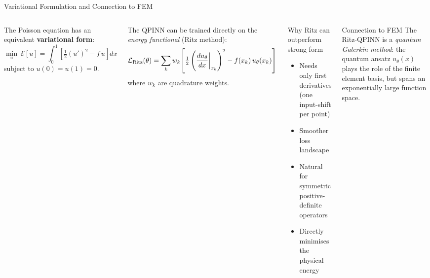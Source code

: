 \documentclass[aspectratio=169,10pt]{beamer}
\begin{document}
\begin{frame}{Variational Formulation and Connection to FEM}
  \begin{columns}[T]
      The Poisson equation has an equivalent \textbf{variational form}:
      \[
        \min_u\,\mathcal{E}[u]
        = \int_0^1\!\left[\tfrac12(u')^2 - f\,u\right]dx
      \]
      subject to $u(0)=u(1)=0$.

      The QPINN can be trained directly on the
      \emph{energy functional} (Ritz method):
      \[
        \mathcal{L}_{\rm Ritz}(\theta)
        = \sum_k w_k\!\left[
            \tfrac12\left(\frac{du_\theta}{dx}\bigg|_{x_k}\right)^2
            - f(x_k)\,u_\theta(x_k)
          \right]
      \]
      where $w_k$ are quadrature weights.
      \begin{block}{Why Ritz can outperform strong form}
        \begin{itemize}
          \item Needs only first derivatives
                (one input-shift per point)
          \item Smoother loss landscape
          \item Natural for symmetric positive-definite operators
          \item Directly minimises the physical energy
        \end{itemize}
      \end{block}
      \vspace{0.2cm}
      \begin{alertblock}{Connection to FEM}
        The Ritz-QPINN is a \emph{quantum Galerkin method}:
        the quantum ansatz $u_\theta(x)$ plays the role of
        the finite element basis, but spans an exponentially
        large function space.
      \end{alertblock}
  \end{columns}
\end{frame}
\end{document}
